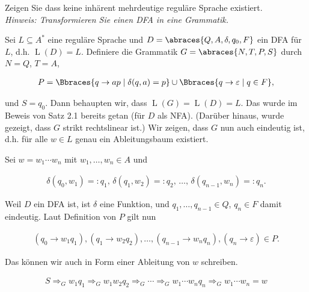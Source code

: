 
\begin{exercise}

Zeigen Sie dass keine inhärent mehrdeutige reguläre Sprache existiert. \\

\textit{Hinweis: Transformieren Sie einen DFA in eine Grammatik.}

\end{exercise}


\begin{solution}

Sei $L \subseteq A^\ast$ eine reguläre Sprache und $D = \abraces{Q, A, \delta, q_0, F}$ ein DFA für $L$, d.h. $\operatorname L(D) = L$.
Definiere die Grammatik $G = \abraces{N, T, P, S}$ durch $N = Q$, $T = A$,

\begin{align*}
    P = \Bbraces{q \to a p \mid \delta(q, a) = p} \cup \Bbraces{q \to \varepsilon \mid q \in F},
\end{align*}

und $S = q_0$.
Dann behaupten wir, dass $\operatorname L(G) = \operatorname L(D) = L$.
Das wurde im Beweis von Satz 2.1 bereits getan (für $D$ als NFA).
(Darüber hinaus, wurde gezeigt, dass $G$ strikt rechtslinear ist.)
Wir zeigen, dass $G$ nun auch eindeutig ist, d.h. für alle $w \in L$ genau ein Ableitungsbaum existiert.

Sei $w = w_1 \cdots w_n$ mit $w_1, \dots, w_n \in A$ und

\begin{align*}
    \delta(q_0, w_1) =: q_1, \,
    \delta(q_1, w_2) =: q_2, \,
    \dots, \,
    \delta(q_{n-1}, w_n) =: q_n.
\end{align*}

Weil $D$ ein DFA ist, ist $\delta$ eine Funktion, und $q_1, \dots, q_{n-1} \in Q$, $q_n \in F$ damit eindeutig.
Laut Definition von $P$ gilt nun

\begin{align*}
    (q_0 \to w_1 q_1),
    (q_1 \to w_2 q_2),
    \dots,
    (q_{n-1} \to w_n q_n),
    (q_n \to \varepsilon)
    \in
    P.
\end{align*}

Das können wir auch in Form einer Ableitung von $w$ schreiben.

\begin{align*}
    S
    \Longrightarrow_G
    w_1 q_1
    \Longrightarrow_G
    w_1 w_2 q_2
    \Longrightarrow_G
    \cdots
    \Longrightarrow_G
    w_1 \cdots w_n q_n
    \Longrightarrow_G
    w_1 \cdots w_n = w
\end{align*}


\end{solution}
